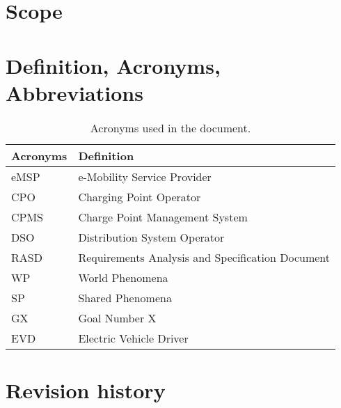 \section{Scope}
\label{sec:scope}


\section{Definition, Acronyms, Abbreviations}
\label{sec:definition_acronyms_abbreviations}
\begin{table}[H]
    \begin{center}
        \begin{tabular}{ |l|l| }
            \hline
            \textbf{Acronyms} & \textbf{Definition}                              \\
            \hline
            eMSP              & e-Mobility Service Provider                      \\
            \hline
            CPO               & Charging Point Operator                          \\
            \hline
            CPMS              & Charge Point Management System                   \\
            \hline
            DSO               & Distribution System Operator                     \\
            \hline
            RASD              & Requirements Analysis and Specification Document \\
            \hline
            WP                & World Phenomena                                  \\
            \hline
            SP                & Shared Phenomena                                 \\
            \hline
            GX                & Goal Number X                                    \\
            \hline
            EVD               & Electric Vehicle Driver                          \\
            \hline
        \end{tabular}
        \caption{Acronyms used in the document.}
        \label{tab:acronyms}
    \end{center}
\end{table}


\section{Revision history}
\label{sec:revision_history}


